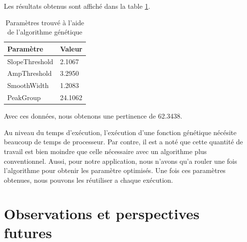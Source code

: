 \documentclass[12pt,letterpaper]{article}
\begin{document}
Les résultats obtenus sont affiché dans la table \ref{tab:genparam}.

\begin{table}[h]
  \begin{center}
    \begin{tabular} {|l|l|}
        \hline
        \bf{Paramètre} & \bf{Valeur} \\
        \hline
        SlopeThreshold & 2.1067 \\
        \hline
        AmpThreshold & 3.2950 \\
        \hline
        SmoothWidth & 1.2083 \\
        \hline
        PeakGroup & 24.1062 \\
        \hline
    \end{tabular}
    \caption{Paramètres trouvé à l'aide de l'algorithme génétique}
    \label{tab:genparam}
  \end{center}
\end{table}

Avec ces données, nous obtenons une pertinence de 62.3438.

Au niveau du temps d'exécution, l'exécution d'une fonction génétique nécésite beaucoup de temps de processeur. Par contre, il est a noté que 
cette quantité de travail est bien moindre que celle nécessaire avec un algorithme plus conventionnel. Aussi, pour notre application, nous n'avons
qu'a rouler une fois l'algorithme pour obtenir les paramètre optimisés. Une fois ces paramètres obtenues, nous pouvons les réutiliser a chaque exécution.

\section{Observations et perspectives futures}
\end{document}
